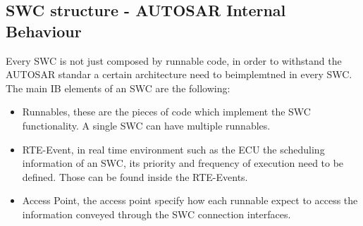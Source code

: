 \documentclass[../main.tex]{subfiles}
\begin{document}
\subsection{SWC structure - AUTOSAR Internal Behaviour}
Every SWC is not just composed by runnable code, in order to withstand the AUTOSAR standar a certain architecture need to beimplemtned in every SWC. The main IB elements of an SWC are the following:
\begin{itemize}
    \item Runnables, these are the pieces of code which implement the SWC functionality. A single SWC can have multiple runnables. 
    \item RTE-Event, in real time environment such as the ECU the scheduling information of an SWC, its priority and frequency of execution need to be defined. Those can be found inside the RTE-Events. 
    \item Access Point, the access point specify how each runnable expect to access the information conveyed through the SWC connection interfaces. 
\end{itemize}
\end{document}
